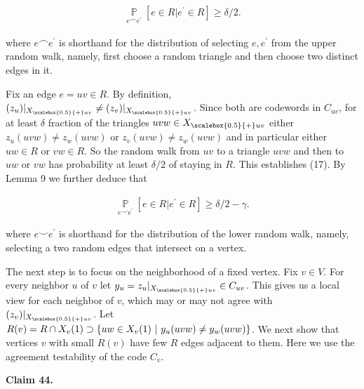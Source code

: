 \documentclass[10pt,a4paper]{article}
\begin{document}
\[\begin{gathered}
\operatorname*{\mathbb{P}}_{e\smallfrown e^{\prime}}[e\in R|e^{\prime}\in R]\geq\delta/2.
\end{gathered}\]


where $e\smallfrown e^{\prime}$ is shorthand for the distribution of selecting $e,e^{\prime}$ from the upper random walk, namely, first choose a random triangle and then choose two distinct edges in it.\par




Fix an edge $e=uv\in R$. By definition, $(z_{u})|_{{X}_{\scalebox{0.5}{+}uv}}\neq(z_{v})|_{{X}_{\scalebox{0.5}{+}uv}}$. Since both are codewords in $C_{uv}$, for at least $\delta$ fraction of the triangles $uvw\in{X}_{\scalebox{0.5}{+}uv}$ either $z_{u}(uvw)\neq z_{w}(uvw)$ or $z_{v}(uvw)\neq z_{w}(uvw)$ and in particular either $uw\in R$ or $vw\in R$. So the random walk from $uv$ to a triangle $uvw$ and then to $uw$ or $vw$ has probability at least $\delta/2$ of staying in $R$. This establishes (17).
By Lemma 9 we further deduce that\par


\[\begin{gathered}
\operatorname*{\mathbb{P}}_{e\smallsmile e^{\prime}}[e\in R|e^{\prime}\in R]\geq\delta/2-\gamma.
\end{gathered}\]


where $e\smallsmile e^{\prime}$ is shorthand for the distribution of the lower random walk, namely, selecting a two random edges that intersect on a vertex.\par




The next step is to focus on the neighborhood of a fixed vertex. Fix $v\in V$. For every neighbor $u$ of $v$ let $y_{u}=z_{u}|_{{X}_{\scalebox{0.5}{+}uv}}\in C_{uv}$. This gives us a local view for each neighbor of $v$, which may or may not agree with $(z_{v})|_{{X}_{\scalebox{0.5}{+}uv}}$. Let $R(v)=R\cap X_{v}(1)\supset\{uw\in X_{v}(1)\nobreak\ |\nobreak\ y_{u}(uvw)\not=y_{w}(uvw)\}$. We next show that vertices $v$ with small $R(v)$ have few $R$ edges adjacent to them. Here we use the agreement testability of the code $C_{v}$.\par





\par\medskip\noindent\textbf{
Claim 44. 
}\par
\end{document}
